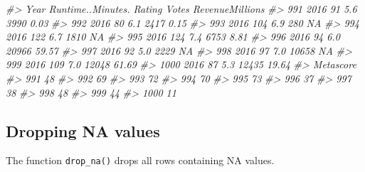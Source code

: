 \documentclass[
]{book}
\newenvironment{Shaded}{\begin{snugshade}}{\end{snugshade}}
\newcommand{\CommentTok}[1]{\textcolor[rgb]{0.56,0.35,0.01}{\textit{#1}}}
\begin{document}
\begin{Shaded}
\begin{Highlighting}[]
\CommentTok{\#\textgreater{}      Year Runtime..Minutes. Rating Votes RevenueMillions}
\CommentTok{\#\textgreater{} 991  2016                91    5.6  3990            0.03}
\CommentTok{\#\textgreater{} 992  2016                80    6.1  2417            0.15}
\CommentTok{\#\textgreater{} 993  2016               104    6.9   280              NA}
\CommentTok{\#\textgreater{} 994  2016               122    6.7  1810              NA}
\CommentTok{\#\textgreater{} 995  2016               124    7.4  6753            8.81}
\CommentTok{\#\textgreater{} 996  2016                94    6.0 20966           59.57}
\CommentTok{\#\textgreater{} 997  2016                92    5.0  2229              NA}
\CommentTok{\#\textgreater{} 998  2016                97    7.0 10658              NA}
\CommentTok{\#\textgreater{} 999  2016               109    7.0 12048           61.69}
\CommentTok{\#\textgreater{} 1000 2016                87    5.3 12435           19.64}
\CommentTok{\#\textgreater{}      Metascore}
\CommentTok{\#\textgreater{} 991         48}
\CommentTok{\#\textgreater{} 992         69}
\CommentTok{\#\textgreater{} 993         72}
\CommentTok{\#\textgreater{} 994         70}
\CommentTok{\#\textgreater{} 995         73}
\CommentTok{\#\textgreater{} 996         37}
\CommentTok{\#\textgreater{} 997         38}
\CommentTok{\#\textgreater{} 998         48}
\CommentTok{\#\textgreater{} 999         44}
\CommentTok{\#\textgreater{} 1000        11}
\end{Highlighting}
\end{Shaded}

\hypertarget{dropping-na-values}{%
\subsection{Dropping NA values}\label{dropping-na-values}}

The function \texttt{drop\_na()} drops all rows containing NA values.
\end{document}
